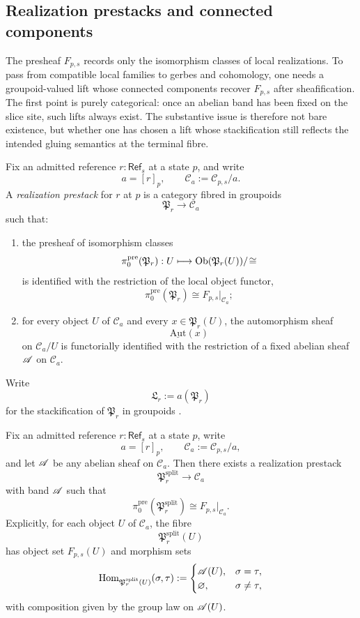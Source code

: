 \subsection{Realization prestacks and connected components}

The presheaf $F_{p,s}$ records only the isomorphism classes of local realizations. To pass from compatible local families to gerbes and cohomology, one needs a groupoid-valued lift whose connected components recover $F_{p,s}$ after sheafification. The first point is purely categorical: once an abelian band has been fixed on the slice site, such lifts always exist. The substantive issue is therefore not bare existence, but whether one has chosen a lift whose stackification still reflects the intended gluing semantics at the terminal fibre.

\begin{definition}\label{def:realization-prestack}
Fix an admitted reference $r:\mathsf{Ref}_s$ at a state $p$, and write
\[
a=[r]_p,
\qquad
\mathcal C_a:=\mathcal C_{p,s}/a.
\]
A \emph{realization prestack} for $r$ at $p$ is a category fibred in groupoids
\[
\mathfrak P_r\to \mathcal C_a
\]
such that:
\begin{enumerate}[label=(\roman*),nosep]
\item the presheaf of isomorphism classes
\[
\pi_0^{\mathrm{pre}}(\mathfrak P_r):U\longmapsto \mathrm{Ob}(\mathfrak P_r(U))/\!\cong
\]
is identified with the restriction of the local object functor,
\[
\pi_0^{\mathrm{pre}}(\mathfrak P_r)\cong F_{p,s}|_{\mathcal C_a};
\]
\item for every object $U$ of $\mathcal C_a$ and every $x\in \mathfrak P_r(U)$, the automorphism sheaf
\[
\underline{\mathrm{Aut}}(x)
\]
on $\mathcal C_a/U$ is functorially identified with the restriction of a fixed abelian sheaf $\mathscr{A}$ on $\mathcal C_a$.
\end{enumerate}
Write
\[
\mathfrak L_r:=a(\mathfrak P_r)
\]
for the stackification of $\mathfrak P_r$ in groupoids \cite[Tag 02ZP]{StacksProject}.
\end{definition}

\begin{proposition}\label{prop:split-realization-prestack}
Fix an admitted reference $r:\mathsf{Ref}_s$ at a state $p$, write
\[
a=[r]_p,
\qquad
\mathcal C_a:=\mathcal C_{p,s}/a,
\]
and let $\mathscr{A}$ be any abelian sheaf on $\mathcal C_a$. Then there exists a realization prestack
\[
\mathfrak P_r^{\mathrm{split}}\to \mathcal C_a
\]
with band $\mathscr{A}$ such that
\[
\pi_0^{\mathrm{pre}}(\mathfrak P_r^{\mathrm{split}})
\cong
F_{p,s}|_{\mathcal C_a}.
\]
Explicitly, for each object $U$ of $\mathcal C_a$, the fibre
\[
\mathfrak P_r^{\mathrm{split}}(U)
\]
has object set $F_{p,s}(U)$ and morphism sets
\[
\mathrm{Hom}_{\mathfrak P_r^{\mathrm{split}}(U)}(\sigma,\tau)
:=
\begin{cases}
\mathscr{A}(U), & \sigma=\tau,\\
\varnothing, & \sigma\neq\tau,
\end{cases}
\]
with composition given by the group law on $\mathscr{A}(U)$.
\end{proposition}

